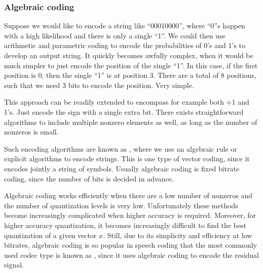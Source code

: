 \documentclass[letterpaper,10pt,english]{jupyterBook}
\begin{document}
\subsubsection{Algebraic coding}
\label{\detokenize{Transmission/Entropy_coding:algebraic-coding}}
\sphinxAtStartPar
Suppose we would like to encode a string like “00010000”, where “0”s
happen with a high likelihood and there is only a single “1”. We could
then use arithmetic and parametric coding to encode the probabilities of
0’s and 1’s to develop an output string. It quickly becomes awfully
complex, when it would be much simpler to just encode the position of
the single “1”. In this case, if the first position is 0, then the
single “1” is at position 3. There are a total of 8 positions, such that
we need 3 bits to encode the position. Very simple.

\sphinxAtStartPar
This approach can be readily extended to encompass for example both +1
and \sphinxhyphen{}1’s. Just encode the sign with a single extra bit. There exists
straightforward algorithms to include multiple non\sphinxhyphen{}zero elements as
well, as long as the number of non\sphinxhyphen{}zeros is small.

\sphinxAtStartPar
Such encoding algorithms are known as , where we use
an algebraic rule or explicit algorithms to encode strings. This is one
type of vector coding, since it encodes jointly a string of symbols.
Usually algebraic coding is fixed bitrate coding, since the number of
bits is decided in advance.

\sphinxAtStartPar
Algebraic coding works efficiently when there are a low number of
non\sphinxhyphen{}zeros and the number of quantization levels is very low.
Unfortunately these methods become increasingly complicated when higher
accuracy is required. Moreover, for higher accuracy quantization, it
becomes increasingly difficult to find the best quantization of a given
vector \(x\). Still, due to its simplicity and efficiency at low bitrates,
algebraic coding is so popular in speech coding that the most commonly
used codec type is known as , since it uses algebraic
coding to encode the residual signal.

\sphinxstepscope
\end{document}
